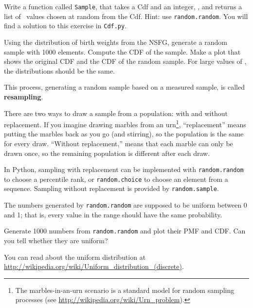 \documentclass[12pt]{book}
\begin{document}
\begin{exercise}
Write a function called {\tt Sample}, that takes a Cdf and
an integer, \n, and returns a list of \n~values chosen at
random from the Cdf.  Hint: use {\tt random.random}.
You will find a solution to this exercise in {\tt Cdf.py}.

Using the distribution of birth weights from the NSFG, generate a
random sample with 1000 elements.  Compute the CDF of the sample.
Make a plot that shows the original CDF and the CDF of the random
sample.  For large values of \n, the distributions should be
the same.

\end{exercise}

This process, generating a random sample based on a measured sample,
is called {\bf resampling}.

There are two ways to draw a sample from a population: with and
without replacement.  If you imagine drawing marbles from an
urn\footnote{The marbles-in-an-urn scenario is a standard model for
  random sampling processes (see
  \url{http://wikipedia.org/wiki/Urn_problem}).}, ``replacement'' means
putting the marbles back as you go (and stirring), so the population
is the same for every draw.  ``Without replacement,'' means that each
marble can only be drawn once, so the remaining population is
different after each draw.

In Python, sampling with replacement can be implemented with
{\tt random.random} to choose a percentile rank, or {\tt random.choice}
to choose an element from a sequence.  Sampling without replacement
is provided by {\tt random.sample}.

\begin{exercise}
The numbers generated by {\tt random.random} are supposed to be
uniform between 0 and 1; that is, every value in the range
should have the same probability.

Generate 1000 numbers from {\tt random.random} and plot their
PMF and CDF.  Can you tell whether they are uniform?

You can read about the uniform distribution at
\url{http://wikipedia.org/wiki/Uniform_distribution_(discrete)}.

\end{exercise}
\end{document}
